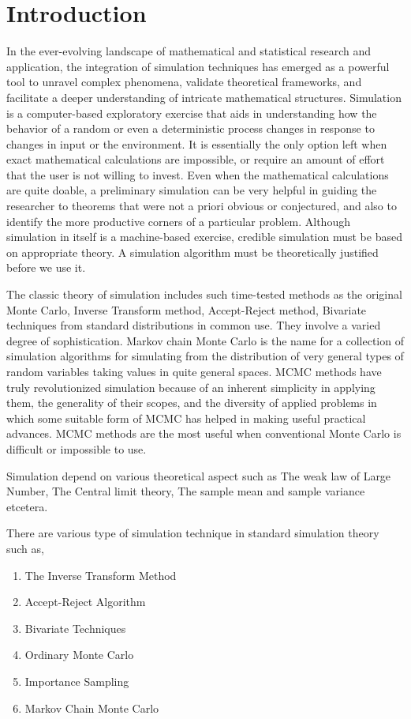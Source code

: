 \chapter{Introduction}

In the ever-evolving landscape of mathematical and statistical research and application, 
the integration of simulation techniques has emerged as a powerful tool to unravel complex phenomena, validate theoretical frameworks, 
and facilitate a deeper understanding of intricate mathematical structures. 
Simulation is a computer-based exploratory exercise that aids in understanding how
the behavior of a random or even a deterministic process changes in response to
changes in input or the environment. It is essentially the only option left when exact
mathematical calculations are impossible, or require an amount of effort that the user
is not willing to invest. Even when the mathematical calculations are quite doable, a
preliminary simulation can be very helpful in guiding the researcher to theorems that
were not a priori obvious or conjectured, and also to identify the more productive
corners of a particular problem. Although simulation in itself is a machine-based
exercise, credible simulation must be based on appropriate theory. A simulation
algorithm must be theoretically justified before we use it.

The classic theory of simulation includes such time-tested methods as the original Monte Carlo, 
Inverse Transform method, Accept-Reject method, Bivariate techniques  
from standard distributions in common use. They involve a varied degree of sophistication. 
Markov chain Monte Carlo is the name for a collection of simulation algorithms for simulating from
the distribution of very general types of random variables taking values in quite
general spaces. MCMC methods have truly revolutionized simulation because of an
inherent simplicity in applying them, the generality of their scopes, and the diversity
of applied problems in which some suitable form of MCMC has helped in making
useful practical advances. MCMC methods are the most useful when conventional
Monte Carlo is difficult or impossible to use.

Simulation depend on various theoretical aspect such as 
The weak law of Large Number, The Central limit theory, The sample mean and sample variance etcetera.

There are various type of simulation technique in standard simulation theory 
such as,

\begin{enumerate}
	\itemsep=-.3em
	\item The Inverse Transform Method
	\item Accept-Reject Algorithm
	\item Bivariate Techniques
	\item Ordinary Monte Carlo
	\item Importance Sampling
	\item Markov Chain Monte Carlo
\end{enumerate}

